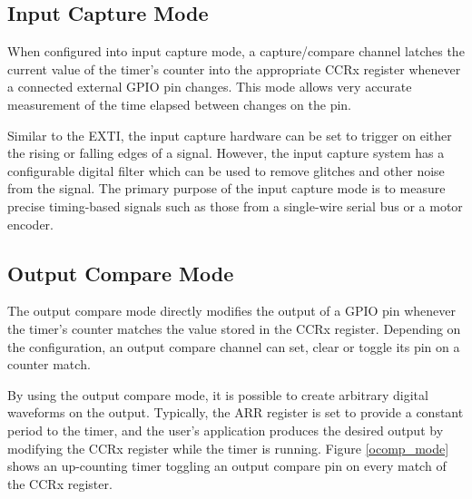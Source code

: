 \documentclass[11pt,fleqn]{book} %
\begin{document}
%    
    
    \subsection{Input Capture Mode}
    When configured into input capture mode, a capture/compare channel latches the current value of the timer's counter into the appropriate CCRx register whenever a connected external GPIO pin changes. This mode allows very accurate measurement of the time elapsed between changes on the pin. 
    
    Similar to the EXTI, the input capture hardware can be set to trigger on either the rising or falling edges of a signal. However, the input capture system has a configurable digital filter which can be used to remove glitches and other noise from the signal. The primary purpose of the input capture mode is to measure precise timing-based signals such as those from a single-wire serial bus or a motor encoder.  
    
    \subsection{Output Compare Mode}
        The output compare mode directly modifies the output of a GPIO pin whenever the timer's counter matches the value stored in the CCRx register. Depending on the configuration, an output compare channel can set, clear or toggle its pin on a counter match. 
        
        By using the output compare mode, it is possible to create arbitrary digital waveforms on the output. Typically, the ARR register is set to provide a constant period to the timer, and the user's application produces the desired output by modifying the CCRx register while the timer is running. Figure \ref{ocomp_mode} shows an up-counting timer toggling an output compare pin on every match of the CCRx register.  
        
\end{document}
